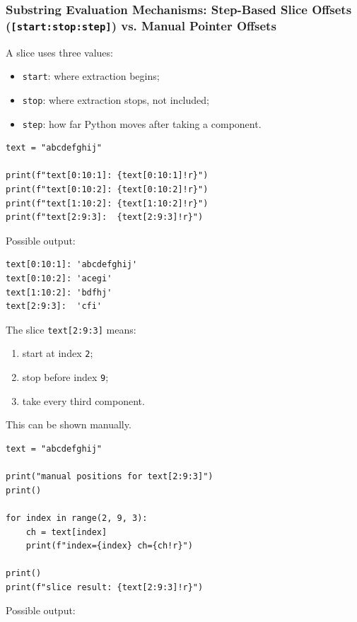 \subsubsection{Substring Evaluation Mechanisms: Step-Based Slice Offsets (\texttt{[start:stop:step]}) vs. Manual Pointer Offsets}

A slice uses three values:

\begin{itemize}
    \item \texttt{start}: where extraction begins;
    \item \texttt{stop}: where extraction stops, not included;
    \item \texttt{step}: how far Python moves after taking a component.
\end{itemize}

\begin{verbatim}
text = "abcdefghij"

print(f"text[0:10:1]: {text[0:10:1]!r}")
print(f"text[0:10:2]: {text[0:10:2]!r}")
print(f"text[1:10:2]: {text[1:10:2]!r}")
print(f"text[2:9:3]:  {text[2:9:3]!r}")
\end{verbatim}

Possible output:

\begin{verbatim}
text[0:10:1]: 'abcdefghij'
text[0:10:2]: 'acegi'
text[1:10:2]: 'bdfhj'
text[2:9:3]:  'cfi'
\end{verbatim}

The slice \texttt{text[2:9:3]} means:

\begin{enumerate}
    \item start at index \texttt{2};
    \item stop before index \texttt{9};
    \item take every third component.
\end{enumerate}

This can be shown manually.

\begin{verbatim}
text = "abcdefghij"

print("manual positions for text[2:9:3]")
print()

for index in range(2, 9, 3):
    ch = text[index]
    print(f"index={index} ch={ch!r}")

print()
print(f"slice result: {text[2:9:3]!r}")
\end{verbatim}

Possible output:

